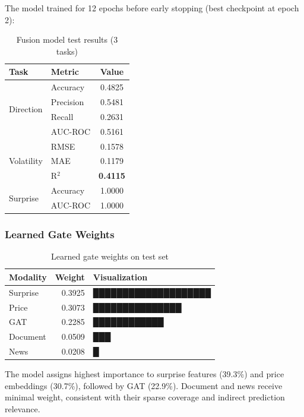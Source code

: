 \documentclass[12pt,a4paper]{article}
\begin{document}
The model trained for 12 epochs before early stopping (best checkpoint at epoch 2):

\begin{table}[H]
\centering
\begin{tabular}{llc}
\toprule
\textbf{Task} & \textbf{Metric} & \textbf{Value} \\
\midrule
\multirow{4}{*}{Direction} & Accuracy & 0.4825 \\
& Precision & 0.5481 \\
& Recall & 0.2631 \\
& AUC-ROC & 0.5161 \\
\midrule
\multirow{3}{*}{Volatility} & RMSE & 0.1578 \\
& MAE & 0.1179 \\
& R$^2$ & \textbf{0.4115} \\
\midrule
\multirow{2}{*}{Surprise} & Accuracy & 1.0000 \\
& AUC-ROC & 1.0000 \\
\bottomrule
\end{tabular}
\caption{Fusion model test results (3 tasks)}
\label{tab:fusion_results}
\end{table}

\subsubsection{Learned Gate Weights}

\begin{table}[H]
\centering
\begin{tabular}{lrl}
\toprule
\textbf{Modality} & \textbf{Weight} & \textbf{Visualization} \\
\midrule
Surprise & 0.3925 & ████████████████████ \\
Price & 0.3073 & ███████████████ \\
GAT & 0.2285 & ████████████ \\
Document & 0.0509 & ███ \\
News & 0.0208 & █ \\
\bottomrule
\end{tabular}
\caption{Learned gate weights on test set}
\label{tab:gate_weights}
\end{table}

\noindent The model assigns highest importance to surprise features (39.3\%) and price embeddings (30.7\%), followed by GAT (22.9\%). Document and news receive minimal weight, consistent with their sparse coverage and indirect prediction relevance.
\end{document}
